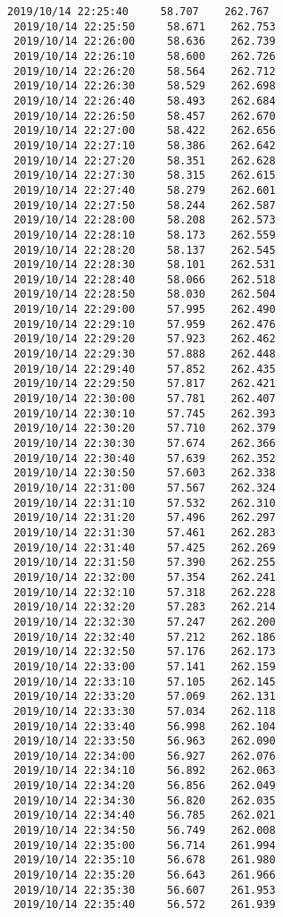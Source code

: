 \documentclass[11pt]{article}
\begin{document}
\begin{Verbatim}[commandchars=\\\{\}]
 2019/10/14 22:25:40     58.707    262.767
 2019/10/14 22:25:50     58.671    262.753
 2019/10/14 22:26:00     58.636    262.739
 2019/10/14 22:26:10     58.600    262.726
 2019/10/14 22:26:20     58.564    262.712
 2019/10/14 22:26:30     58.529    262.698
 2019/10/14 22:26:40     58.493    262.684
 2019/10/14 22:26:50     58.457    262.670
 2019/10/14 22:27:00     58.422    262.656
 2019/10/14 22:27:10     58.386    262.642
 2019/10/14 22:27:20     58.351    262.628
 2019/10/14 22:27:30     58.315    262.615
 2019/10/14 22:27:40     58.279    262.601
 2019/10/14 22:27:50     58.244    262.587
 2019/10/14 22:28:00     58.208    262.573
 2019/10/14 22:28:10     58.173    262.559
 2019/10/14 22:28:20     58.137    262.545
 2019/10/14 22:28:30     58.101    262.531
 2019/10/14 22:28:40     58.066    262.518
 2019/10/14 22:28:50     58.030    262.504
 2019/10/14 22:29:00     57.995    262.490
 2019/10/14 22:29:10     57.959    262.476
 2019/10/14 22:29:20     57.923    262.462
 2019/10/14 22:29:30     57.888    262.448
 2019/10/14 22:29:40     57.852    262.435
 2019/10/14 22:29:50     57.817    262.421
 2019/10/14 22:30:00     57.781    262.407
 2019/10/14 22:30:10     57.745    262.393
 2019/10/14 22:30:20     57.710    262.379
 2019/10/14 22:30:30     57.674    262.366
 2019/10/14 22:30:40     57.639    262.352
 2019/10/14 22:30:50     57.603    262.338
 2019/10/14 22:31:00     57.567    262.324
 2019/10/14 22:31:10     57.532    262.310
 2019/10/14 22:31:20     57.496    262.297
 2019/10/14 22:31:30     57.461    262.283
 2019/10/14 22:31:40     57.425    262.269
 2019/10/14 22:31:50     57.390    262.255
 2019/10/14 22:32:00     57.354    262.241
 2019/10/14 22:32:10     57.318    262.228
 2019/10/14 22:32:20     57.283    262.214
 2019/10/14 22:32:30     57.247    262.200
 2019/10/14 22:32:40     57.212    262.186
 2019/10/14 22:32:50     57.176    262.173
 2019/10/14 22:33:00     57.141    262.159
 2019/10/14 22:33:10     57.105    262.145
 2019/10/14 22:33:20     57.069    262.131
 2019/10/14 22:33:30     57.034    262.118
 2019/10/14 22:33:40     56.998    262.104
 2019/10/14 22:33:50     56.963    262.090
 2019/10/14 22:34:00     56.927    262.076
 2019/10/14 22:34:10     56.892    262.063
 2019/10/14 22:34:20     56.856    262.049
 2019/10/14 22:34:30     56.820    262.035
 2019/10/14 22:34:40     56.785    262.021
 2019/10/14 22:34:50     56.749    262.008
 2019/10/14 22:35:00     56.714    261.994
 2019/10/14 22:35:10     56.678    261.980
 2019/10/14 22:35:20     56.643    261.966
 2019/10/14 22:35:30     56.607    261.953
 2019/10/14 22:35:40     56.572    261.939

\end{Verbatim}
\end{document}
